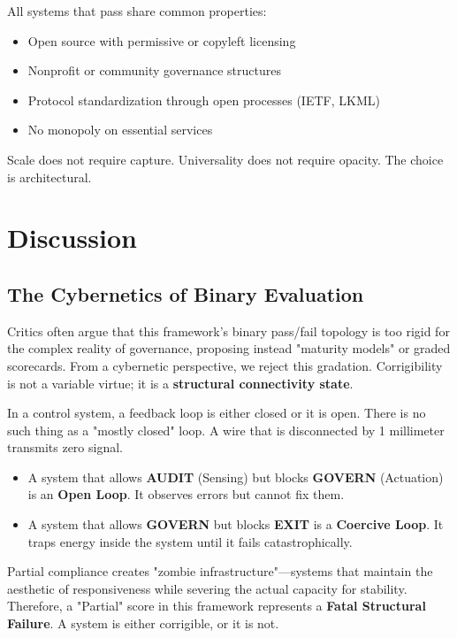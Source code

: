 \documentclass{article}
\begin{document}
All systems that pass share common properties:
\begin{itemize}
    \item Open source with permissive or copyleft licensing
    \item Nonprofit or community governance structures
    \item Protocol standardization through open processes (IETF, LKML)
    \item No monopoly on essential services
\end{itemize}

Scale does not require capture. Universality does not require opacity. The choice is architectural.

\section{Discussion}

\subsection{The Cybernetics of Binary Evaluation}

Critics often argue that this framework's binary pass/fail topology is too rigid for the complex reality of governance, proposing instead "maturity models" or graded scorecards. From a cybernetic perspective, we reject this gradation. Corrigibility is not a variable virtue; it is a \textbf{structural connectivity state}.

In a control system, a feedback loop is either closed or it is open. There is no such thing as a "mostly closed" loop. A wire that is disconnected by 1 millimeter transmits zero signal.

\begin{itemize}
    \item A system that allows \textbf{AUDIT} (Sensing) but blocks \textbf{GOVERN} (Actuation) is an \textbf{Open Loop}. It observes errors but cannot fix them.
    \item A system that allows \textbf{GOVERN} but blocks \textbf{EXIT} is a \textbf{Coercive Loop}. It traps energy inside the system until it fails catastrophically.
\end{itemize}

Partial compliance creates "zombie infrastructure"---systems that maintain the aesthetic of responsiveness while severing the actual capacity for stability. Therefore, a "Partial" score in this framework represents a \textbf{Fatal Structural Failure}. A system is either corrigible, or it is not.
\end{document}
